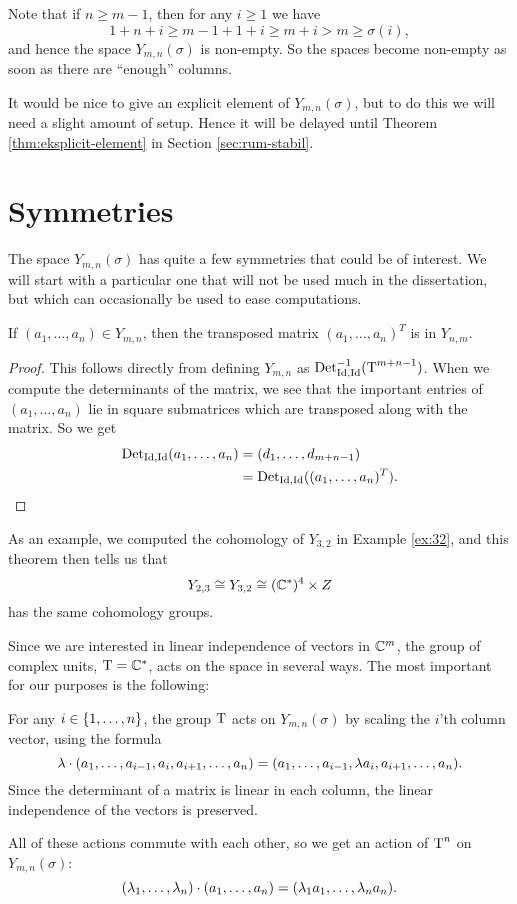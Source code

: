 \begin{remark}
  Note that if $n \geq m-1$, then for any $i\geq 1$ we have
  \[ 1 + n + i \geq m - 1 + 1 +i \geq m+i > m \geq \sigma(i), \] 
  and hence the space $Y_{m,n}(\sigma)$ is non-empty. So the spaces
  become non-empty as
  soon as there are ``enough'' columns.
\end{remark}
It would be nice to give an explicit element of
$Y_{m,n}(\sigma)$, but to do this we will need a slight amount of
setup. Hence it will be delayed until Theorem
\ref{thm:eksplicit-element} in Section \ref{sec:rum-stabil}.

\section{Symmetries}

The space $Y_{m,n}(\sigma)$ has quite a few symmetries that could be
of interest. We will start with a particular one that will not be used
much in the dissertation, but which can occasionally be used to ease
computations.
\begin{lemma}
  \label{lem:transponering}
  If $(a_1,\dots,a_n) \in Y_{m,n}$, then the transposed matrix
  $(a_1,\dots,a_n)^T$ is in $Y_{n,m}$.
\end{lemma}
\begin{proof}
  This follows directly from defining $Y_{m,n}$ as
  $\operatorname{Det}_{\operatorname{Id},\operatorname{Id}}^{-1}(\operatorname{T}^{m+n-1})$. When we compute the determinants
  of the matrix, we see that the important entries of
  $(a_1,\dots,a_n)$ lie in square submatrices which are transposed
  along with the matrix. So we get
  \begin{align*}
    \operatorname{Det}_{\operatorname{Id},\operatorname{Id}}(a_1,\dots,a_n) &= (d_1,\dots,d_{m+n-1}) \\
    &= \operatorname{Det}_{\operatorname{Id},\operatorname{Id}}( (a_1,\dots,a_n)^T ).
  \end{align*}
\end{proof}

As an example, we computed the cohomology of $Y_{3,2}$ in Example
\ref{ex:32}, and this theorem then tells us that
\[ Y_{2,3} \cong Y_{3,2} \cong (\mathbb{C}^*)^4\times Z \]
has the same cohomology groups.

Since we are interested in linear independence of vectors in $\mathbb{C}^m$,
the group of complex units, $\operatorname{T}=\mathbb{C}^*$, acts on the space 
in several ways. The 
most important for our purposes is the following:
\begin{definition}
  For any $i \in \left\{ 1,\dots,n \right\}$, the group $\operatorname{T}$ acts
  on $Y_{m,n}(\sigma)$ by scaling the $i$'th column vector,
  using the formula
  \[ \lambda \cdot (a_1,\dots,a_{i-1},a_i,a_{i+1},\dots,a_n) =
  (a_1,\dots,a_{i-1},\lambda a_i,a_{i+1},\dots,a_n). \]
  Since the determinant of a matrix is linear in each column, the
  linear independence of the vectors is preserved.

  All of these actions commute with each other, so we get an action of
  $\operatorname{T}^n$ on $Y_{m,n}(\sigma)$:
  \[ (\lambda_1,\dots,\lambda_n) \cdot (a_1,\dots,a_n) = (\lambda_1 a_1,\dots, \lambda_n
  a_n). \]
\end{definition}

